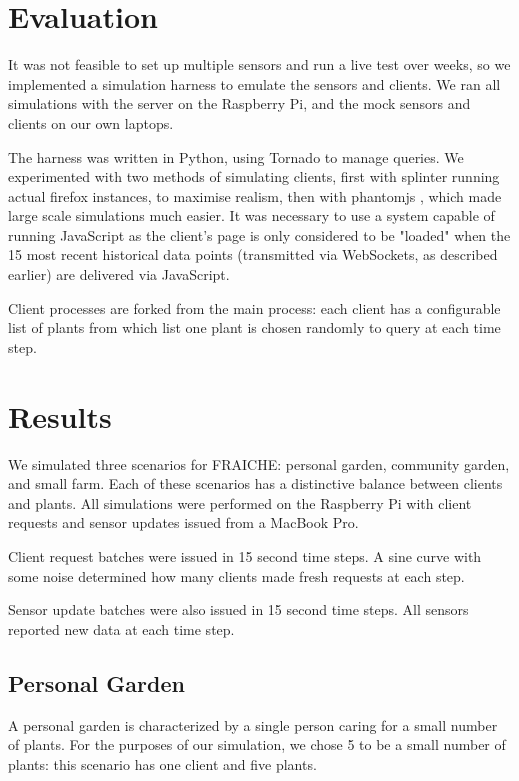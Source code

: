\documentclass[a4paper]{acm_proc_article-sp}
\begin{document}
\section{Evaluation}

It was not feasible to set up multiple sensors and run a live test over weeks, so we implemented a simulation harness to emulate the sensors and clients.  We ran all simulations with the server on the Raspberry Pi, and the mock sensors and clients on our own laptops. 

The harness was written in Python, using Tornado to manage queries.  We experimented with two methods of simulating clients, first with splinter \cite{} running actual firefox instances, to maximise realism, then with phantomjs \cite{}, which made large scale simulations much easier.  It was necessary to use a system capable of running JavaScript as the client's page is only considered to be "loaded" when the 15 most recent historical data points (transmitted via WebSockets, as described earlier) are delivered via JavaScript.

Client processes are forked from the main process: each client has a configurable list of plants from which list one plant is chosen randomly to query at each time step.  

\section{Results}

We simulated three scenarios for FRAICHE: personal garden, community garden, and small farm.  Each of these scenarios has a distinctive balance between clients and plants.  All simulations were performed on the Raspberry Pi with client requests and sensor updates issued from a MacBook Pro.

Client request batches were issued in 15 second time steps.  A sine curve with some noise determined how many clients made fresh requests at each step.

Sensor update batches were also issued in 15 second time steps.  All sensors reported new data at each time step.

\subsection{Personal Garden}

A personal garden is characterized by a single person caring for a small number of plants.  For the purposes of our simulation, we chose 5 to be a small number of plants: this scenario has one client and five plants.
\end{document}
